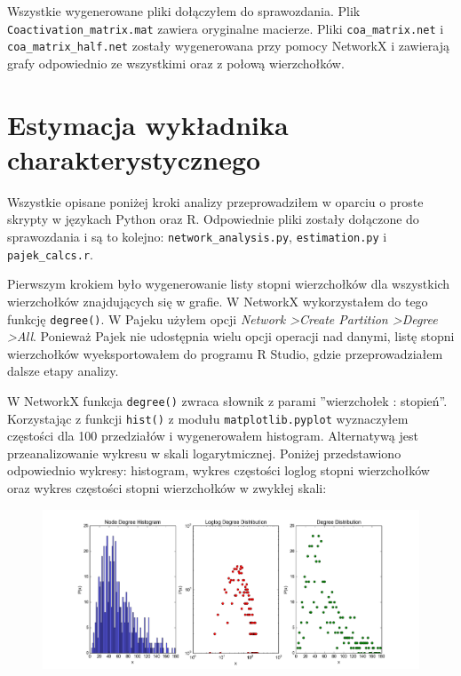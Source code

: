 \documentclass[a4paper,10pt]{article}
\begin{document}
	Wszystkie wygenerowane pliki dołączyłem do sprawozdania. Plik \linebreak\texttt{Coactivation\_matrix.mat} zawiera oryginalne macierze. Pliki \mbox{\texttt{coa\_matrix.net}} i \mbox{\texttt{coa\_matrix\_half.net}} zostały wygenerowana przy pomocy NetworkX i zawierają grafy odpowiednio ze wszystkimi oraz z połową wierzchołków.

	\section{Estymacja wykładnika charakterystycznego}
		Wszystkie opisane poniżej kroki analizy przeprowadziłem w oparciu o proste skrypty w językach Python oraz R. Odpowiednie pliki zostały dołączone do sprawozdania i są to kolejno:
		\texttt{network\_analysis.py}, \texttt{estimation.py} i \texttt{pajek\_calcs.r}.

		Pierwszym krokiem było wygenerowanie listy stopni wierzchołków dla wszystkich wierzchołków znajdujących się w grafie. W NetworkX wykorzystałem do tego funkcję \texttt{degree()}. W Pajeku użyłem opcji \textit{Network \textgreater Create Partition \textgreater Degree \textgreater All}. Ponieważ Pajek nie udostępnia wielu opcji operacji nad danymi, listę stopni wierzchołków wyeksportowałem do programu R Studio, gdzie przeprowadziałem dalsze etapy analizy.

		W NetworkX funkcja \texttt{degree()} zwraca słownik z parami ''wierzchołek : stopień''. Korzystając z funkcji \texttt{hist()} z modułu \texttt{matplotlib.pyplot} wyznaczyłem częstości dla 100 przedziałów i wygenerowałem histogram. Alternatywą jest przeanalizowanie wykresu w skali logarytmicznej. Poniżej przedstawiono odpowiednio wykresy: histogram, wykres częstości loglog stopni wierzchołków oraz wykres częstości stopni wierzchołków w zwykłej skali:
		\begin{figure}[H]
			\raggedleft
			\includegraphics[width=\linewidth, trim=50pt 30pt 50pt 25pt, clip]{figure_1}
			\hfill
		\end{figure}
\end{document}
